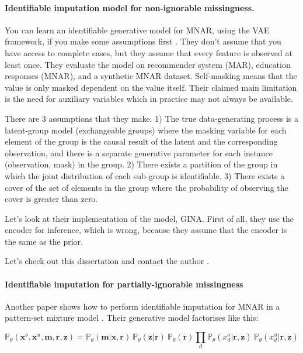 \documentclass[a4paper,12pt,twoside,openright]{report}
\begin{document}
\paragraph{Identifiable imputation model for non-ignorable missingness.} You can learn an identifiable generative model for MNAR, using the VAE framework, if you make some assumptions first \parencite{maIdentifiableGenerativeModels2021}. They don't assume that you have access to complete cases, but they assume that every feature is observed at least once. They evaluate the model on recommender system (MAR), education responses (MNAR), and a synthetic MNAR dataset. Self-masking means that the value is only masked dependent on the value itself. Their claimed main limitation is the need for auxiliary variables which in practice may not always be available.

There are 3 assumptions that they make. 1) The true data-generating process is a latent-group model (exchangeable groups) where the masking variable for each element of the group is the causal result of the latent and the corresponding observation, and there is a separate generative parameter for each instance (observation, mask) in the group. 2) There exists a partition of the group in which the joint distribution of each sub-group is identifiable. 3) There exists a cover of the set of elements in the group where the probability of observing the cover is greater than zero.

Let's look at their implementation of the model, GINA. First of all, they use the encoder for inference, which is wrong, because they assume that the encoder is the same as the prior.

Let's check out this dissertation and contact the author \parencite{maAdvancesBayesianMachine2022}.

\paragraph{Identifiable imputation for partially-ignorable missingness} Another paper shows how to perform identifiable imputation for MNAR in a pattern-set mixture model \parencite{ghalebikesabiDeepGenerativeMissingness2021}. Their generative model factorises like this:

\begin{equation*}
    \mathbb{P}_\theta (\mathbf{x}^o, \mathbf{x}^u, \mathbf{m}, \mathbf{r}, \mathbf{z}) = \mathbb{P}_\theta (\mathbf{m} | \mathbf{x}, \mathbf{r}) ~ \mathbb{P}_\theta (\mathbf{z} | \mathbf{r}) ~ \mathbb{P}_\theta (\mathbf{r}) \prod_{d} \mathbb{P}_\theta (x^o_d | \mathbf{r}, \mathbf{z}) ~ \mathbb{P}_\theta (x^u_d | \mathbf{r}, \mathbf{z})
\end{equation*}
\end{document}
